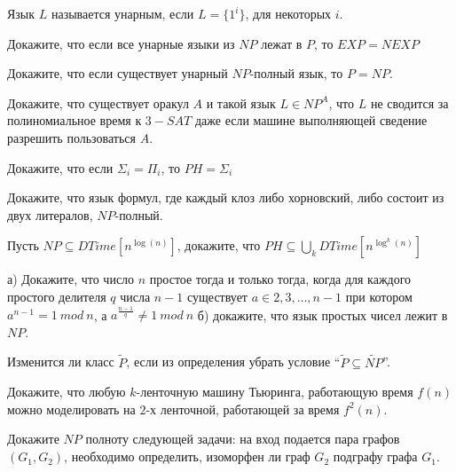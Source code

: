 \setcounter{curtask}{11}


Язык $L$ называется унарным, если $L = \{1^{i}\}$, для некоторых $i$.

\begin{task}
	Докажите, что если все унарные языки из $NP$ лежат в $P$, то $EXP = NEXP$
\end{task}

\begin{task}
	Докажите, что если существует унарный $NP$-полный язык, то $P = NP$.
\end{task}

\begin{task}
    Докажите, что существует оракул $A$ и такой язык $L \in NP^A$, что $L$ не
    сводится за полиномиальное время к $3-SAT$ даже если машине выполняющей сведение
    разрешить пользоваться $A$.
\end{task}

\begin{task}
    Докажите, что если $\Sigma_i = \Pi_i$, то $PH = \Sigma_i$
\end{task}

\begin{task}
	Докажите, что язык формул, где каждый клоз либо хорновский, либо состоит из двух
    литералов, $NP$-полный.
\end{task}

\begin{task}
    Пусть $NP \subseteq DTime[n^{\log(n)}]$, докажите, что $PH \subseteq \bigcup\limits_{k}DTime[n^{\log^k(n)}]$
\end{task}

\breakline

\begin{ptask}{4}
    а) Докажите, что число $n$ простое тогда и только тогда, когда для каждого
    простого делителя $q$ числа $n - 1$ существует $a \in {2, 3, \dots, n - 1}$ при котором
    $a^{n - 1} = 1~mod~n$, а $a^{\frac{n - 1}{q}} \ne 1~mod~n$
    б) докажите, что язык простых чисел лежит в $NP$.
\end{ptask}

\begin{ptask}{7}
    Изменится ли класс $\widetilde{P}$, если из определения убрать условие
    ``$\widetilde{P} \subseteq \widetilde{NP}$''.
\end{ptask}

\begin{ptask}{8}
    Докажите, что любую $k$-ленточную машину Тьюринга, работающую время $f(n)$ можно
    моделировать на $2$-х ленточной, работающей за время $f^2(n)$.
\end{ptask}

\begin{ptask}{10}
    Докажите $NP$ полноту следующей задачи:
    на вход подается пара графов $(G_1, G_2)$, необходимо определить, изоморфен ли
    граф $G_2$ подграфу графа $G_1$.
\end{ptask}